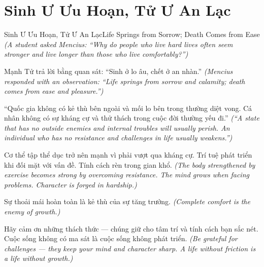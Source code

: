 \section{Sinh Ư Ưu Hoạn, Tử Ư An Lạc}
\begin{truyen}{Sinh Ư Ưu Hoạn, Tử Ư An Lạc}{Life Springs from Sorrow; Death Comes from Ease}
\textit{(A student asked Mencius: ``Why do people who live hard lives often seem stronger and live longer than those who live comfortably?'')}

Mạnh Tử trả lời bằng quan sát: ``Sinh ở lo âu, chết ở an nhàn.''
\textit{(Mencius responded with an observation: ``Life springs from sorrow and calamity; death comes from ease and pleasure.'')}

``Quốc gia không có kẻ thù bên ngoài và mối lo bên trong thường diệt vong. Cá nhân không có sự kháng cự và thử thách trong cuộc đời thường yếu đi.''
\textit{(``A state that has no outside enemies and internal troubles will usually perish. An individual who has no resistance and challenges in life usually weakens.'')}

Cơ thể tập thể dục trở nên mạnh vì phải vượt qua kháng cự. Trí tuệ phát triển khi đối mặt với vấn đề. Tính cách rèn trong gian khổ.
\textit{(The body strengthened by exercise becomes strong by overcoming resistance. The mind grows when facing problems. Character is forged in hardship.)}

Sự thoải mái hoàn toàn là kẻ thù của sự tăng trưởng.
\textit{(Complete comfort is the enemy of growth.)}

\end{truyen}

\begin{baihoc}
Hãy cảm ơn những thách thức — chúng giữ cho tâm trí và tính cách bạn sắc nét. Cuộc sống không có ma sát là cuộc sống không phát triển.
\textit{(Be grateful for challenges — they keep your mind and character sharp. A life without friction is a life without growth.)}
\end{baihoc}
\ngancach

